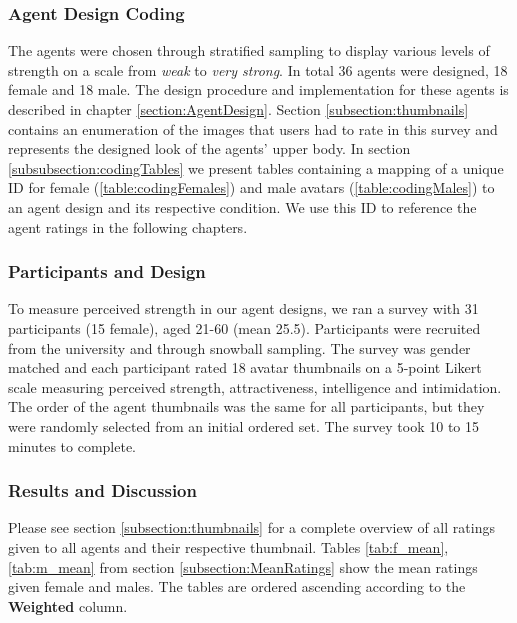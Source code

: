 \subsubsection{Agent Design Coding}
The agents were chosen through stratified sampling to display various levels of strength on a scale from \textit{weak} to \textit{very strong}. In total 36 agents were designed, 18 female and 18 male. The design procedure and implementation for these agents is described in chapter \ref{section:AgentDesign}. Section \ref{subsection:thumbnails} contains an enumeration of the images that users had to rate in this survey and represents the designed look of the agents' upper body. In section \ref{subsubsection:codingTables} we present tables containing a mapping of a unique ID for female (\ref{table:codingFemales}) and male avatars (\ref{table:codingMales}) to an agent design and its respective condition. We use this ID to reference the agent ratings in the following chapters.

\subsubsection{Participants and Design}
To measure perceived strength in our agent designs, we ran a survey with 31 participants (15 female), aged 21-60 (mean 25.5). Participants were recruited from the university and through snowball sampling. The survey was gender matched and each participant rated 18 avatar thumbnails on a 5-point Likert  scale measuring perceived strength, attractiveness, intelligence and intimidation. The order of the agent thumbnails was the same for all participants, but they were randomly selected from an initial ordered set. The survey took 10 to 15 minutes to complete.

\subsubsection{Results and Discussion}
\label{section:surveyResults}
Please see section \ref{subsection:thumbnails} for a complete overview of all ratings given to all agents and their respective thumbnail. Tables \ref{tab:f_mean}, \ref{tab:m_mean} from section \ref{subsection:MeanRatings} show the mean ratings given female and males. The tables are ordered ascending according to the \textbf{Weighted} column.


